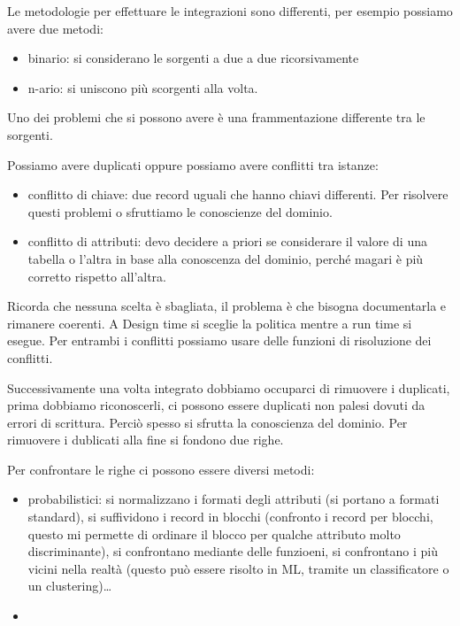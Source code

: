 Le metodologie per effettuare le integrazioni sono differenti, per esempio possiamo 
avere due metodi:
\begin{itemize}
      \item binario: si considerano le sorgenti a due a due ricorsivamente
      \item n-ario: si uniscono più scorgenti alla volta.
\end{itemize}

Uno dei problemi che si possono avere è una frammentazione differente tra le
sorgenti.

Possiamo avere duplicati oppure possiamo avere conflitti tra istanze:
\begin{itemize}
      \item conflitto di chiave: due record uguali che hanno chiavi differenti.
      Per risolvere questi problemi o sfruttiamo le conoscienze del dominio.
      \item conflitto di attributi: devo decidere a priori se considerare il valore 
      di una tabella o l'altra in base alla conoscenza del dominio, perché magari 
      è più corretto rispetto all'altra. 
\end{itemize}
Ricorda che nessuna scelta è sbagliata, il problema è che bisogna documentarla e 
rimanere coerenti. A Design time si sceglie la politica mentre a run time si esegue.
Per entrambi i conflitti possiamo usare delle funzioni di risoluzione dei conflitti.

Successivamente una volta integrato dobbiamo occuparci di rimuovere i duplicati,
prima dobbiamo riconoscerli, ci possono essere duplicati non palesi dovuti da errori 
di scrittura. Perciò spesso si sfrutta la conoscienza del dominio. Per rimuovere i 
dublicati alla fine si fondono due righe.

Per confrontare le righe ci possono essere diversi metodi:
\begin{itemize}
      \item probabilistici: si normalizzano i formati degli attributi (si portano a 
      formati standard), si suffividono i record in blocchi (confronto i record 
      per blocchi, questo mi permette di ordinare il blocco per qualche attributo
      molto discriminante), si confrontano mediante delle funzioeni, si confrontano 
      i più vicini nella realtà (questo può essere risolto in ML, tramite un classificatore 
      o un clustering)\dots
      \item 
\end{itemize}



